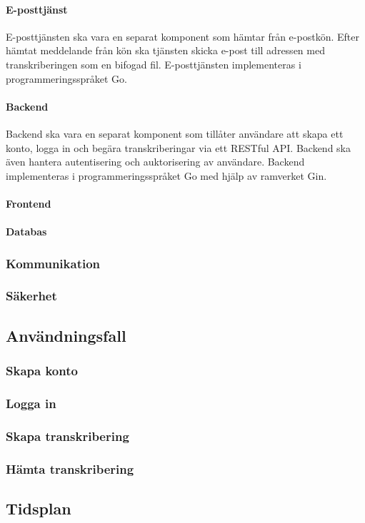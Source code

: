 \paragraph{E-posttjänst}
E-posttjänsten ska vara en separat komponent som hämtar från e-postkön. Efter
hämtat meddelande från kön ska tjänsten skicka e-post till adressen med
transkriberingen som en bifogad fil. E-posttjänsten implementeras i 
programmeringsspråket Go.

\paragraph{Backend}
Backend ska vara en separat komponent som tillåter användare att skapa ett
konto, logga in och begära transkriberingar via ett RESTful API. Backend ska
även hantera autentisering och auktorisering av användare. Backend implementeras
i programmeringsspråket Go med hjälp av ramverket Gin.

\paragraph{Frontend}

\paragraph{Databas}

\subsubsection{Kommunikation}

\subsubsection{Säkerhet}

\subsection{Användningsfall}

\subsubsection{Skapa konto}

\subsubsection{Logga in}

\subsubsection{Skapa transkribering}

\subsubsection{Hämta transkribering}

\subsection{Tidsplan}
